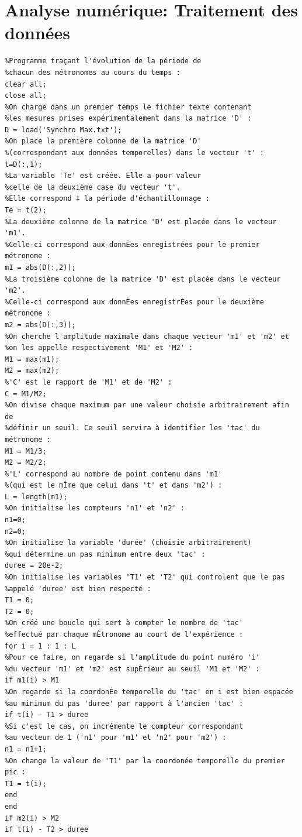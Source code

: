 \documentclass[a4paper,11pt]{report}
\begin{document}
\chapter{Analyse numérique: Traitement des données}
\label{Traitement}
\begin{verbatim}
%Programme traçant l'évolution de la période de
%chacun des métronomes au cours du temps :
clear all;
close all;
%On charge dans un premier temps le fichier texte contenant
%les mesures prises expérimentalement dans la matrice 'D' :
D = load('Synchro Max.txt');
%On place la première colonne de la matrice 'D'
%(correspondant aux données temporelles) dans le vecteur 't' :
t=D(:,1);
%La variable 'Te' est créée. Elle a pour valeur
%celle de la deuxième case du vecteur 't'.
%Elle correspond ‡ la période d'échantillonnage :
Te = t(2);
%La deuxième colonne de la matrice 'D' est placée dans le vecteur 'm1'.
%Celle-ci correspond aux donnÈes enregistrées pour le premier métronome :
m1 = abs(D(:,2));
%La troisième colonne de la matrice 'D' est placée dans le vecteur 'm2'.
%Celle-ci correspond aux donnÈes enregistrÈes pour le deuxième métronome :
m2 = abs(D(:,3));
%On cherche l'amplitude maximale dans chaque vecteur 'm1' et 'm2' et
%on les appelle respectivement 'M1' et 'M2' :
M1 = max(m1);
M2 = max(m2);
%'C' est le rapport de 'M1' et de 'M2' :
C = M1/M2;
%On divise chaque maximum par une valeur choisie arbitrairement afin de
%définir un seuil. Ce seuil servira à identifier les 'tac' du métronome :
M1 = M1/3;
M2 = M2/2;
%'L' correspond au nombre de point contenu dans 'm1'
%(qui est le mÍme que celui dans 't' et dans 'm2') :
L = length(m1);
%On initialise les compteurs 'n1' et 'n2' :
n1=0;
n2=0;
%On initialise la variable 'durée' (choisie arbitrairement)
%qui détermine un pas minimum entre deux 'tac' :
duree = 20e-2;
%On initialise les variables 'T1' et 'T2' qui controlent que le pas
%appelé 'duree' est bien respecté :
T1 = 0;
T2 = 0;
%On créé une boucle qui sert à compter le nombre de 'tac'
%effectué par chaque mÈtronome au court de l'expérience :
for i = 1 : 1 : L
%Pour ce faire, on regarde si l'amplitude du point numéro 'i'
%du vecteur 'm1' et 'm2' est supÈrieur au seuil 'M1 et 'M2' :
if m1(i) > M1
%On regarde si la coordonÈe temporelle du 'tac' en i est bien espacée
%au minimum du pas 'duree' par rapport à l'ancien 'tac' :
if t(i) - T1 > duree
%Si c'est le cas, on incrémente le compteur correspondant
%au vecteur de 1 ('n1' pour 'm1' et 'n2' pour 'm2') :
n1 = n1+1;
%On change la valeur de 'T1' par la coordonée temporelle du premier pic :
T1 = t(i);
end
end
if m2(i) > M2
if t(i) - T2 > duree

\end{verbatim}
\end{document}
